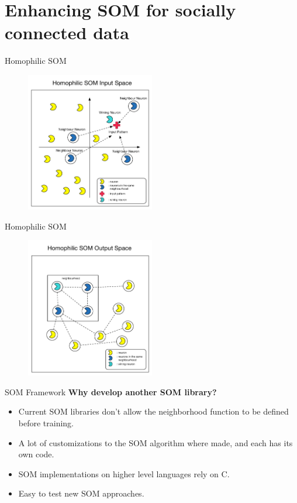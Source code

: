 \section{Enhancing SOM for socially connected data}
\begin{frame}{Homophilic SOM}
  \begin{figure}
    \includegraphics[width=0.5\textwidth]{images/homophilic_input_space.pdf}
  \end{figure}
\end{frame}

\begin{frame}{Homophilic SOM}
  \begin{figure}
    \includegraphics[width=0.5\textwidth]{images/homophilic_outputspace.pdf}
  \end{figure}
\end{frame}

\begin{frame}{SOM Framework}
  \textbf{Why develop another SOM library? }
  \begin{itemize}
    \item Current SOM libraries don't allow the neighborhood function to be defined before training. 
    \item A lot of customizations to the SOM algorithm where made, and each has its own code. 
    \item SOM implementations on higher level languages rely on C. 
    \item Easy to test new SOM approaches.
  \end{itemize}
\end{frame}

